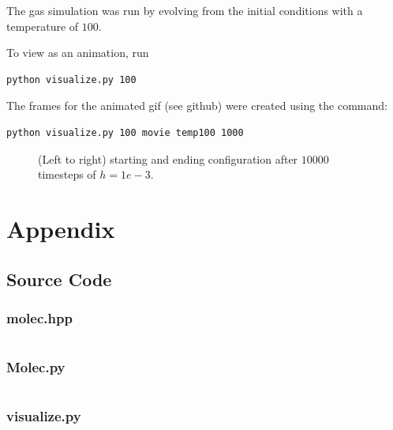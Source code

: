 \documentclass[12pt]{article}
\begin{document}
The gas simulation was run by evolving from the initial conditions with a
temperature of $100$.

To view as an animation, run

\begin{verbatim}
python visualize.py 100
\end{verbatim}

The frames for the animated gif (see github) were created using the command:

\begin{verbatim}
python visualize.py 100 movie temp100 1000
\end{verbatim}

\begin{figure}[H]
  \caption{(Left to right) starting and ending configuration after $10000$
    timesteps of $h = 1e-3$.}
\end{figure}

\section*{Appendix}

\subsection*{Source Code}

\subsubsection*{molec.hpp}

\inputminted{c++}{molec.hpp}

\newpage

\subsubsection*{Molec.py}

\inputminted{python}{Molec.py}

\newpage

\subsubsection*{visualize.py}
\end{document}
